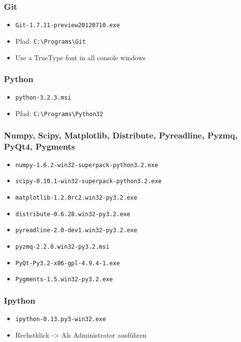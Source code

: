 \subsubsection{Git}
\begin{itemize}
  \item \texttt{Git-1.7.11-preview20120710.exe}
  \item Pfad: \verb|C:\Programs\Git|
  \item Use a TrueType font in all console windows
\end{itemize}

\subsubsection{Python}
\begin{itemize}
  \item \texttt{python-3.2.3.msi}
  \item Pfad: \verb|C:\Programs\Python32|
\end{itemize}

\subsubsection{Numpy, Scipy, Matplotlib, Distribute, Pyreadline, Pyzmq, PyQt4, Pygments}
\begin{itemize}
  \item \texttt{numpy-1.6.2-win32-superpack-python3.2.exe}
  \item \texttt{scipy-0.10.1-win32-superpack-python3.2.exe}
  \item \texttt{matplotlib-1.2.0rc2.win32-py3.2.exe}
  \item \texttt{distribute-0.6.28.win32-py3.2.exe}
  \item \texttt{pyreadline-2.0-dev1.win32-py3.2.exe}
  \item \texttt{pyzmq-2.2.0.win32-py3.2.msi}
  \item \texttt{PyQt-Py3.2-x86-gpl-4.9.4-1.exe}
  \item \texttt{Pygments-1.5.win32-py3.2.exe}
\end{itemize}

\subsubsection{Ipython}
\begin{itemize}
  \item \texttt{ipython-0.13.py3-win32.exe}
  \item Rechstklick -> Als Administrator ausführen
\end{itemize}

